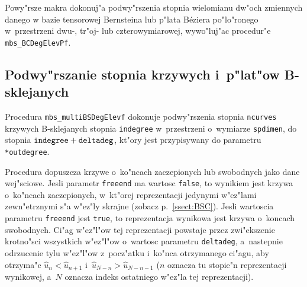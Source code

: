 Powy"rsze makra dokonuj"a podwy"rszenia stopnia wielomianu dw"och
zmiennych danego w bazie tensorowej Bernsteina lub p"lata B\'{e}ziera
po"lo"ronego w~przes\-trze\-ni dwu-, tr"oj- lub czterowymiarowej,
wywo"luj"ac procedur"e \texttt{mbs\_BCDegElevPf}.


\subsection{Podwy"rszanie stopnia krzywych i~p"lat"ow B-sklejanych}

\begin{sloppypar}
\hspace*{\parindent}
Procedura \texttt{mbs\_multiBSDegElevf} dokonuje podwy"rszenia stopnia
\texttt{ncurves} krzywych B-sklejanych stopnia \texttt{indegree}
w~przestrzeni o~wymiarze \texttt{spdimen}, do stopnia
$\mathord{\mbox{\texttt{indegree}}}+\mathord{\mbox{\texttt{deltadeg}}}$,
kt"ory jest przypisywany do parametru \texttt{*outdegree}.
\end{sloppypar}

Procedura dopuszcza krzywe o~ko"ncach zaczepionych lub swobodnych jako dane
wej"sciowe. Jesli parametr \texttt{freeend} ma wartosc \texttt{false}, to
wynikiem jest krzywa o~ko"ncach zaczepionych,
w~kt"orej reprezentacji jedynymi w"ez"lami zewn"etrznymi s"a w"ez"ly
skrajne (zobacz p.~\ref{ssect:BSC}). Jesli wartoscia parametru
\texttt{freeend} jest \texttt{true}, to reprezentacja wynikowa jest krzywa
o~koncach swobodnych. Ci"ag w"ez"l"ow tej reprezentacji powstaje przez
zwi"ekszenie krotno"sci wszystkich w"ez"l"ow o~wartosc parametru
\texttt{deltadeg}, a~nastepnie odrzucenie tylu w"ez"l"ow z~pocz"atku i~ko"nca
otrzymanego ci"agu, aby otrzyma"c $\hat{u}_n<\hat{u}_{n+1}$
i~$\hat{u}_{N-n}>\hat{u}_{N-n-1}$ ($n$ oznacza tu stopie"n reprezentacji
wynikowej, a~$N$ oznacza indeks ostatniego w"ez"la tej reprezentacji).

